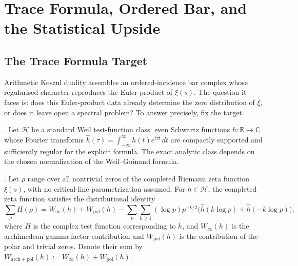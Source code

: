 \chapter{Trace Formula, Ordered Bar, and the Statistical Upside}
\label{v4-arith:tfe-gutzwiller}

\section{The Trace Formula Target}
\label{v4-arith:tfe:weil}

Arithmetic Koszul duality assembles an ordered-incidence
bar complex whose regularised character reproduces the Euler product of
\(\xi(s)\). The question it faces is: does this Euler-product data
already determine the zero distribution of \(\xi\), or does it leave
open a spectral problem? To answer precisely, fix the target.

\begin{definition}
\label{v4-arith:tfe:defn:test-class}
\ClaimStatusDefinitional. Let \(\mathcal H\) be a standard Weil
test-function class: even Schwartz functions \(h : \mathbb{R} \to \mathbb{C}\)
whose Fourier transforms \(\widehat h(\tau) = \int_{-\infty}^\infty h(t) e^{i\tau t}\,dt\)
are compactly supported and sufficiently regular for the explicit
formula. The exact analytic class depends on the chosen normalization
of the Weil--Guinand formula.
\end{definition}

\begin{theorem}
\label{v4-arith:tfe:thm:weil}
\ClaimStatusProvedElsewhere. Let \(\rho\) range over all nontrivial
zeros of the completed Riemann zeta function \(\xi(s)\), with no
critical-line parametrization assumed.
For \(h \in \mathcal H\), the completed zeta function satisfies the
distributional identity
\begin{equation}
\label{v4-arith:tfe:eq:weil}
\sum_\rho H(\rho)
=
W_\infty(h)+W_{\mathrm{pol}}(h)
-\sum_{p}\sum_{k\geq 1}
(\log p)p^{-k/2}
\bigl(\widehat h(k\log p)+\widehat h(-k\log p)\bigr),
\end{equation}
where \(H\) is the complex test function corresponding to \(h\), and
\(W_\infty(h)\) is the archimedean gamma-factor contribution
and \(W_{\mathrm{pol}}(h)\) is the contribution of the polar and
trivial zeros. Denote their sum by
\(W_{\mathrm{arch+pol}}(h) := W_\infty(h) + W_{\mathrm{pol}}(h)\).
\end{theorem}

